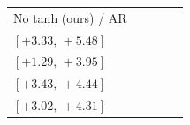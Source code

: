 \begin{table}[t]
\begin{tabular}{@{}lrrrr@{}}
No tanh (ours) / AR & \shortstack[r]{$\textcolor{gainpositive}{\mathbf{+4.37}}$\\$[+3.33,\,+5.48]$} & \shortstack[r]{$\textcolor{gainpositive}{\mathbf{+2.72}}$\\$[+1.29,\,+3.95]$} & \shortstack[r]{$\textcolor{gainpositive}{\mathbf{+3.93}}$\\$[+3.43,\,+4.44]$} & \shortstack[r]{$\textcolor{gainpositive}{\mathbf{+3.67}}$\\$[+3.02,\,+4.31]$} \\[3pt]
\bottomrule\end{tabular}\endgroup\end{table}
